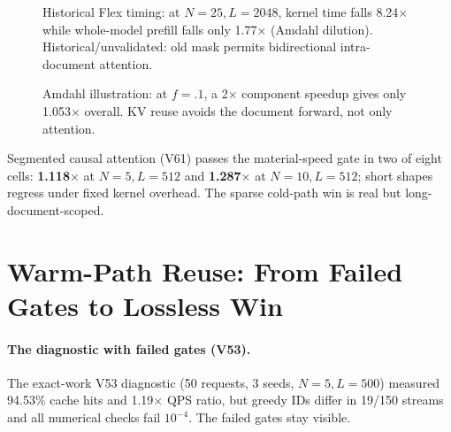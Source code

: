 \begin{table}[H]
\centering\footnotesize
\caption{SDPA kernel dispatch and wall time per prefill forward at the
95\%-sparsity shape (V101). The 4D additive mask trades flash for the
memory-efficient kernel; sparsity changes nothing.}
\label{tab:dispatch}
\end{table}

\begin{figure}[H]
\centering\resizebox{.74\linewidth}{!}{}
\caption{Historical Flex timing: at $N{=}25,L{=}2048$, kernel time falls
8.24$\times$ while whole-model prefill falls only 1.77$\times$ (Amdahl
dilution). Historical/unvalidated: old mask permits bidirectional
intra-document attention.}
\label{fig:flexhistory}
\end{figure}

\begin{figure}[H]
\centering\resizebox{.60\linewidth}{!}{}
\caption{Amdahl illustration: at $f{=}.1$, a 2$\times$ component speedup
gives only 1.053$\times$ overall. KV reuse avoids the document forward, not
only attention.}
\label{fig:amdahl}
\end{figure}

Segmented causal attention (V61) passes the material-speed gate in two of
eight cells: \textbf{1.118$\times$} at $N{=}5,L{=}512$ and
\textbf{1.287$\times$} at $N{=}10,L{=}512$; short shapes regress under
fixed kernel overhead. The sparse cold-path win is real but
long-document-scoped.

\section{Warm-Path Reuse: From Failed Gates to Lossless Win}
\label{sec:cache}

\paragraph{The diagnostic with failed gates (V53).}
The exact-work V53 diagnostic (50 requests, 3 seeds, $N{=}5,L{=}500$)
measured 94.53\% cache hits and 1.19$\times$ QPS ratio, but greedy IDs
differ in 19/150 streams and all numerical checks fail $10^{-4}$. The
failed gates stay visible.

\begin{center}
\end{center}

